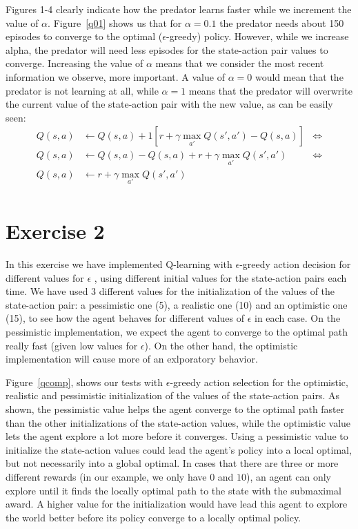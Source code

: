 \documentclass[a4paper,11pt]{article}
\begin{document}
Figures 1-4 clearly indicate how the predator learns faster while we increment the value of $\alpha$. Figure~\ref{q01} shows us that for $\alpha = 0.1$ the predator needs about 150 episodes to converge to the optimal ($\epsilon$-greedy) policy. However, while we increase alpha, the predator will need less episodes for the state-action pair values to converge. Increasing the value of $\alpha$ means that we consider the most recent information we observe, more important. A value of $\alpha = 0$ would mean that the predator is not learning at all, while $\alpha = 1$ means that the predator will overwrite the current value of the state-action pair with the new value, as can be easily seen:
\begin{align*}
  Q(s,a) &\leftarrow  Q(s,a) + 1 \left[ r + \gamma  \max_{a'} Q(s',a') - Q(s,a)\right] & \Longleftrightarrow\\
  Q(s,a) &\leftarrow  Q(s,a) - Q(s,a) + r + \gamma  \max_{a'} Q(s',a') & \Longleftrightarrow\\
  Q(s,a) &\leftarrow  r + \gamma  \max_{a'} Q(s',a') \\
\end{align*}
 
\section*{Exercise 2}

In this exercise we have implemented Q-learning with $\epsilon$-greedy action decision for different values for $\epsilon$ , using different initial values for the state-action pairs each time. We have used 3 different values for the initialization of the values of the state-action pair: a pessimistic one (5), a realistic one (10) and an optimistic one (15), to see how the agent behaves for different values of $\epsilon$ in each case. On the pessimistic implementation, we expect the agent to converge to the optimal path really fast (given low values for $\epsilon$). On the other hand, the optimistic implementation will cause more of an exlporatory behavior.


Figure~\ref{qcomp}, shows our tests with $\epsilon$-greedy action selection for the optimistic, realistic and pessimistic initialization of the values of the state-action pairs. As shown, the pessimistic value helps the agent converge to the optimal path faster than the other initializations of the state-action values, while the optimistic value lets the agent explore a lot more before it converges. Using a pessimistic value to initialize the state-action values could lead the agent's policy into a local optimal, but not necessarily into a global optimal. In cases that there are three or more different rewards (in our example, we only have $0$ and $10$), an agent can only explore until it finds the locally optimal path to the state with the submaximal award. A higher value for the initialization would have lead this agent to explore the world better before its policy converge to a locally optimal policy. 
\end{document}
